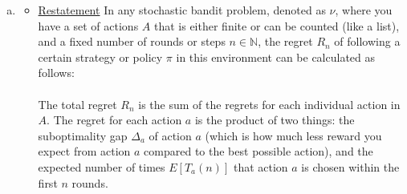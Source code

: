 \documentclass{article}
\begin{document}
\begin{enumerate}[a)]
\begin{enumerate}[i)]
        \item 
        \begin{proof}
           \renewcommand{\qedsymbol}{$\blacksquare$}
            \hfill\\\\
           Since $q(1), q(2), \dots, q(10)$ are i.i.d. random variables, the expected value of a greedy action becomes $\mathbb{E}[q_{*}] = b$.\\
           Moreover, since $q(a)$ is $\mathcal{N}(0,1)$, the expected average of all the action values becomes $\mathbb{E}\left[\frac{\sum_{i = 1}^{10} q(i)}{10}\right] = 0$.\\
           Therefore, the long-run reward is
           \begin{equation*}
               \begin{aligned}
                   R &= (1 - \epsilon) \cdot \mathbb{E}[q_{*}] + \epsilon \cdot \mathbb{E}\left[\frac{\sum_{i = 1}^{10} q(i)}{10}\right]\\
                   &= (1 - \epsilon) \cdot b + \epsilon \cdot 0\\
                   &= (1 - \epsilon) \cdot b
               \end{aligned}
           \end{equation*}\par 
        \end{proof}
    \end{enumerate}
    \item 
    \begin{itemize}
        \item \underline{Restatement}
        In any stochastic bandit problem, denoted as \(\nu\), where you have a set of actions \(A\) that is either finite or can be counted (like a list), and a fixed number of rounds or steps \(n \in \mathbb{N}\), the regret \(R_n\) of following a certain strategy or policy \(\pi\) in this environment can be calculated as follows:
        \\\\
        The total regret \(R_n\) is the sum of the regrets for each individual action in \(A\). The regret for each action \(a\) is the product of two things: the suboptimality gap \(\Delta_a\) of action \(a\) (which is how much less reward you expect from action \(a\) compared to the best possible action), and the expected number of times \(E[T_a(n)]\) that action \(a\) is chosen within the first \(n\) rounds.


\end{itemize}
\end{enumerate}
\end{document}
